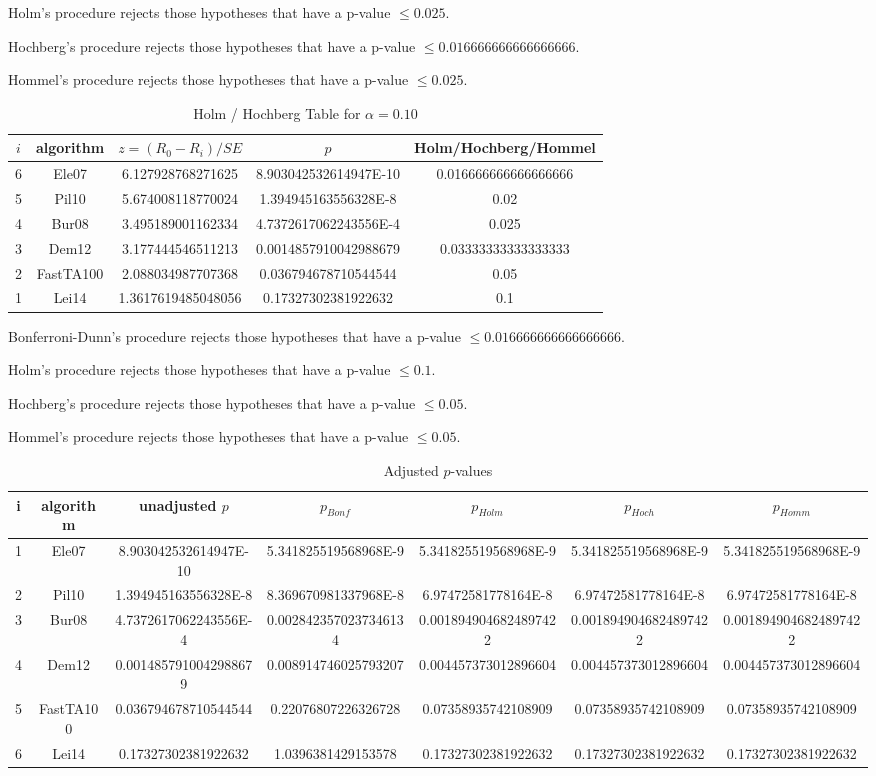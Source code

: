 \documentclass[a4paper,10pt]{article}
\begin{document}
\begin{landscape}
Holm's procedure rejects those hypotheses that have a p-value $\le0.025$.


Hochberg's procedure rejects those hypotheses that have a p-value $\le0.016666666666666666$.


Hommel's procedure rejects those hypotheses that have a p-value $\le0.025$.


\begin{table}[!htp]
\centering\tiny
\caption{Holm / Hochberg Table for $\alpha=0.10$}
\begin{tabular}{ccccc}
$i$&algorithm&$z=(R_0 - R_i)/SE$&$p$&Holm/Hochberg/Hommel\\
\hline
6&Ele07&6.127928768271625&8.903042532614947E-10&0.016666666666666666\\
5&Pil10&5.674008118770024&1.394945163556328E-8&0.02\\
4&Bur08&3.495189001162334&4.7372617062243556E-4&0.025\\
3&Dem12&3.177444546511213&0.0014857910042988679&0.03333333333333333\\
2&FastTA100&2.088034987707368&0.036794678710544544&0.05\\
1&Lei14&1.3617619485048056&0.17327302381922632&0.1\\
\hline
\end{tabular}
\end{table}
Bonferroni-Dunn's procedure rejects those hypotheses that have a p-value $\le0.016666666666666666$.


Holm's procedure rejects those hypotheses that have a p-value $\le0.1$.


Hochberg's procedure rejects those hypotheses that have a p-value $\le0.05$.


Hommel's procedure rejects those hypotheses that have a p-value $\le0.05$.


\begin{table}[!htp]
\centering\tiny
\caption{Adjusted $p$-values}
\begin{tabular}{ccccccc}
i&algorithm&unadjusted $p$&$p_{Bonf}$&$p_{Holm}$&$p_{Hoch}$&$p_{Homm}$\\
\hline
1&Ele07&8.903042532614947E-10&5.341825519568968E-9&5.341825519568968E-9&5.341825519568968E-9&5.341825519568968E-9\\
2&Pil10&1.394945163556328E-8&8.369670981337968E-8&6.97472581778164E-8&6.97472581778164E-8&6.97472581778164E-8\\
3&Bur08&4.7372617062243556E-4&0.0028423570237346134&0.0018949046824897422&0.0018949046824897422&0.0018949046824897422\\
4&Dem12&0.0014857910042988679&0.008914746025793207&0.004457373012896604&0.004457373012896604&0.004457373012896604\\
5&FastTA100&0.036794678710544544&0.22076807226326728&0.07358935742108909&0.07358935742108909&0.07358935742108909\\
6&Lei14&0.17327302381922632&1.0396381429153578&0.17327302381922632&0.17327302381922632&0.17327302381922632\\
\hline
\end{tabular}
\end{table}


\end{landscape}
\end{document}
